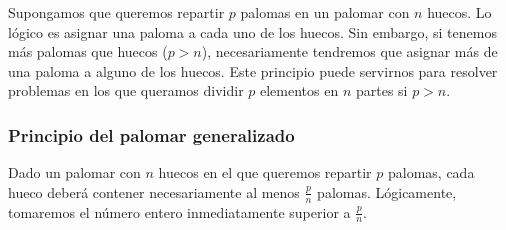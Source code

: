 Supongamos que queremos repartir $p$ palomas en un palomar con $n$ huecos.
Lo lógico es asignar una paloma a cada uno de los huecos.
Sin embargo, si tenemos más palomas que huecos ($p >n$), necesariamente tendremos que asignar más de una paloma a alguno de los huecos.
Este principio puede servirnos para resolver problemas en los que queramos dividir $p$ elementos en $n$ partes si $p > n$.

\subsubsection{Principio del palomar generalizado}

Dado un palomar con $n$ huecos en el que queremos repartir $p$ palomas, cada hueco deberá contener necesariamente al menos $\frac{p}{n}$ palomas.
Lógicamente, tomaremos el número entero inmediatamente superior a $\frac{p}{n}$.
